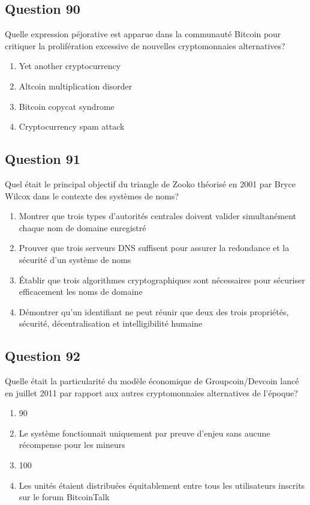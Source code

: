 \documentclass[12pt,a4paper]{article}
\begin{document}
\bigskip


\subsection*{Question 90}
Quelle expression péjorative est apparue dans la communauté Bitcoin pour critiquer la prolifération excessive de nouvelles cryptomonnaies alternatives?

\begin{enumerate}[label=\Alph*., leftmargin=*]
\item Yet another cryptocurrency
\item Altcoin multiplication disorder
\item Bitcoin copycat syndrome
\item Cryptocurrency spam attack
\end{enumerate}

\bigskip


\subsection*{Question 91}
Quel était le principal objectif du triangle de Zooko théorisé en 2001 par Bryce Wilcox dans le contexte des systèmes de noms?

\begin{enumerate}[label=\Alph*., leftmargin=*]
\item Montrer que trois types d'autorités centrales doivent valider simultanément chaque nom de domaine enregistré
\item Prouver que trois serveurs DNS suffisent pour assurer la redondance et la sécurité d'un système de noms
\item Établir que trois algorithmes cryptographiques sont nécessaires pour sécuriser efficacement les noms de domaine
\item Démontrer qu'un identifiant ne peut réunir que deux des trois propriétés, sécurité, décentralisation et intelligibilité humaine
\end{enumerate}

\bigskip


\subsection*{Question 92}
Quelle était la particularité du modèle économique de Groupcoin/Devcoin lancé en juillet 2011 par rapport aux autres cryptomonnaies alternatives de l'époque?

\begin{enumerate}[label=\Alph*., leftmargin=*]
\item 90%
\item Le système fonctionnait uniquement par preuve d'enjeu sans aucune récompense pour les mineurs
\item 100%
\item Les unités étaient distribuées équitablement entre tous les utilisateurs inscrits sur le forum BitcoinTalk
\end{enumerate}
\end{document}
